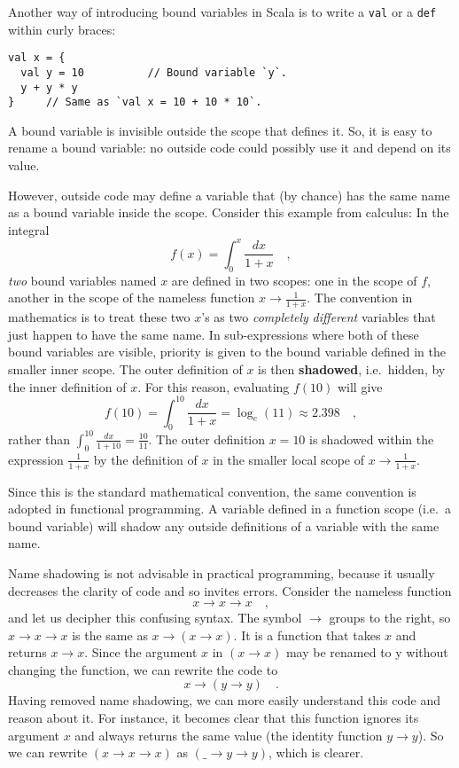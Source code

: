 Another way of introducing bound variables in Scala is to write a
\lstinline!val! or a \lstinline!def! within curly braces:
\begin{lstlisting}
val x = {
  val y = 10          // Bound variable `y`.
  y + y * y
}     // Same as `val x = 10 + 10 * 10`.
\end{lstlisting}

A bound variable is invisible outside the scope that defines it. So,
it is easy to rename a bound variable: no outside code could possibly
use it and depend on its value.

However, outside code may define a variable that (by chance) has the
same name as a bound variable inside the scope. Consider this example
from calculus: In the integral
\[
f(x)=\int_{0}^{x}\frac{dx}{1+x}\quad,
\]
\emph{two} bound variables named $x$ are defined in two scopes: one
in the scope of $f$, another in the scope of the nameless function
$x\rightarrow\frac{1}{1+x}$. The convention in mathematics is to
treat these two $x$\textsf{'}s as two \emph{completely} \emph{different} variables
that just happen to have the same name. In sub-expressions where both
of these bound variables are visible, priority is given to the bound
variable defined in the smaller inner scope. The outer definition
of $x$ is then \textbf{shadowed}, i.e.\ hidden,
by the inner definition of $x$. For this reason, evaluating $f(10)$
will give
\[
f(10)=\int_{0}^{10}\frac{dx}{1+x}=\log_{e}(11)\approx2.398\quad,
\]
rather than $\int_{0}^{10}\frac{dx}{1+10}=\frac{10}{11}$. The outer
definition $x=10$ is shadowed within the expression $\frac{1}{1+x}$
by the definition of $x$ in the smaller local scope of $x\rightarrow\frac{1}{1+x}$.

Since this is the standard mathematical convention, the same convention
is adopted in functional programming. A variable defined in a function
scope (i.e.\ a bound variable) will shadow any outside definitions
of a variable with the same name.

Name shadowing is not advisable in practical programming, because
it usually decreases the clarity of code and so invites errors. Consider
the nameless function
\[
x\rightarrow x\rightarrow x\quad,
\]
and let us decipher this confusing syntax. The symbol $\rightarrow$
groups to the right, so $x\rightarrow x\rightarrow x$ is the same
as $x\rightarrow\left(x\rightarrow x\right)$. It is a function that
takes $x$ and returns $x\rightarrow x$. Since the argument $x$
in $\left(x\rightarrow x\right)$ may be renamed to y without changing
the function, we can rewrite the code to
\[
x\rightarrow\left(y\rightarrow y\right)\quad.
\]
Having removed name shadowing, we can more easily understand this
code and reason about it. For instance, it becomes clear that this
function ignores its argument $x$ and always returns the same value
(the identity function $y\rightarrow y$). So we can rewrite $\left(x\rightarrow x\rightarrow x\right)$
as $\left(\_\rightarrow y\rightarrow y\right)$, which is clearer.

